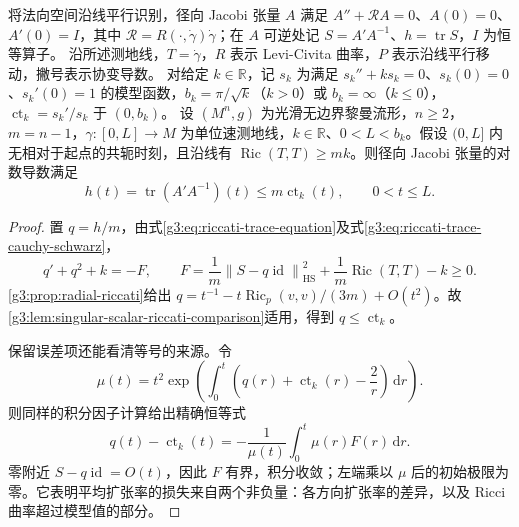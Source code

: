 \begin{theorem}\label{g3:thm:riccati-trace-comparison}
	将法向空间沿线平行识别，径向 Jacobi 张量 \(A\) 满足 \(A''+\mathcal RA=0\)、\(A(0)=0\)、\(A'(0)=I\)，其中 \(\mathcal R=R(\cdot,\dot\gamma)\dot\gamma\)；在 \(A\) 可逆处记 \(S=A'A^{-1}\)、\(h=\operatorname{tr}S\)，\(I\) 为恒等算子。
	沿所述测地线，\(T=\dot\gamma\)，\(R\) 表示 Levi-Civita 曲率，\(P\) 表示沿线平行移动，撇号表示协变导数。
	对给定 \(k\in\mathbb R\)，记 \(s_k\) 为满足 \(s_k''+ks_k=0\)、\(s_k(0)=0\)、\(s_k'(0)=1\) 的模型函数，\(b_k=\pi/\sqrt k\)（\(k>0\)）或 \(b_k=\infty\)（\(k\le0\)），\(\operatorname{ct}_k=s_k'/s_k\) 于 \((0,b_k)\)。
	设 \((M^n,g)\) 为光滑无边界黎曼流形，\(n\ge2\)，\(m=n-1\)，\(\gamma:[0,L]\to M\) 为单位速测地线，\(k\in\mathbb R\)、\(0<L<b_k\)。假设 \((0,L]\) 内无相对于起点的共轭时刻，且沿线有 \(\operatorname{Ric}(T,T)\ge mk\)。则径向 Jacobi 张量的对数导数满足
	\begin{equation}\label{g3:eq:riccati-trace-comparison}
		h(t)=\operatorname{tr}(A'A^{-1})(t)\le m\operatorname{ct}_k(t),\qquad0<t\le L.
	\end{equation}
\end{theorem}
\begin{proof}
	置 \(q=h/m\)，由式\eqref{g3:eq:riccati-trace-equation}及式\eqref{g3:eq:riccati-trace-cauchy-schwarz}，
	\[
		q'+q^2+k=-F,\qquad
		F=\frac1m\left\lVert S-q\operatorname{id}\right\rVert_{\mathrm{HS}}^2
		+\frac1m\operatorname{Ric}(T,T)-k\ge0.
	\]
	\cref{g3:prop:radial-riccati}给出
	\(q=t^{-1}-t\operatorname{Ric}_p(v,v)/(3m)+O(t^2)\)。故\cref{g3:lem:singular-scalar-riccati-comparison}适用，得到 \(q\le\operatorname{ct}_k\)。

	保留误差项还能看清等号的来源。令
	\[
		\mu(t)=t^2\exp\left(\int_0^t\left(q(r)+\operatorname{ct}_k(r)-\frac2r\right)\,\mathrm dr\right).
	\]
	则同样的积分因子计算给出精确恒等式
	\begin{equation}\label{g3:eq:riccati-trace-defect}
		q(t)-\operatorname{ct}_k(t)
		=-\frac1{\mu(t)}\int_0^t\mu(r)F(r)\,\mathrm dr.
	\end{equation}
	零附近 \(S-q\operatorname{id}=O(t)\)，因此 \(F\) 有界，积分收敛；左端乘以 \(\mu\) 后的初始极限为零。它表明平均扩张率的损失来自两个非负量：各方向扩张率的差异，以及 Ricci 曲率超过模型值的部分。
\end{proof}

